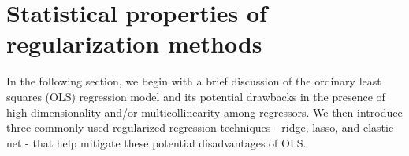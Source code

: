 \section{Statistical properties of regularization methods}
\label{section:theory}

\noindent In the following section, we begin with a brief discussion of the ordinary least squares (OLS) regression model and its potential drawbacks in the presence of high dimensionality and/or multicollinearity among regressors. We then introduce three commonly used regularized regression techniques - ridge, lasso, and elastic net - that help mitigate these potential disadvantages of OLS.











